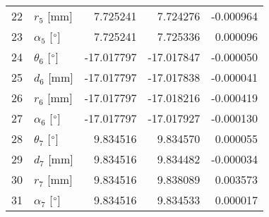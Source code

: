 \documentclass{standalone}%
\begin{document}
\begin{tabular}{llrrr}
22 &              $r_{5}$ [mm] &   7.725241 &   7.724276 &  -0.000964 \\
23 &  $\alpha_{5}$ [$\degree$] &   7.725241 &   7.725336 &   0.000096 \\
24 &  $\theta_{6}$ [$\degree$] & -17.017797 & -17.017847 &  -0.000050 \\
25 &              $d_{6}$ [mm] & -17.017797 & -17.017838 &  -0.000041 \\
26 &              $r_{6}$ [mm] & -17.017797 & -17.018216 &  -0.000419 \\
27 &  $\alpha_{6}$ [$\degree$] & -17.017797 & -17.017927 &  -0.000130 \\
28 &  $\theta_{7}$ [$\degree$] &   9.834516 &   9.834570 &   0.000055 \\
29 &              $d_{7}$ [mm] &   9.834516 &   9.834482 &  -0.000034 \\
30 &              $r_{7}$ [mm] &   9.834516 &   9.838089 &   0.003573 \\
31 &  $\alpha_{7}$ [$\degree$] &   9.834516 &   9.834533 &   0.000017 \\
\bottomrule
\end{tabular}
%
\end{document}
